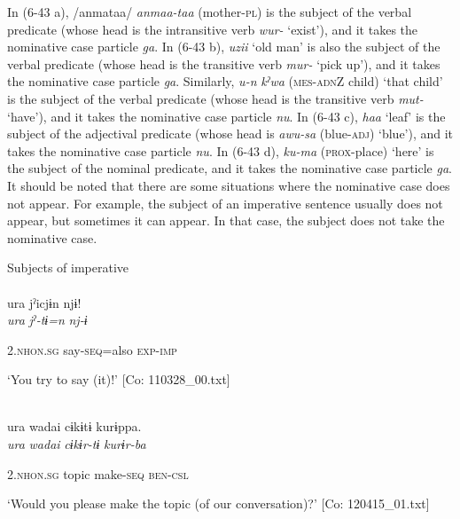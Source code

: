 In (6-43 a), /anmataa/ \textit{anmaa-taa} (mother-\textsc{pl}) is the subject of the verbal predicate (whose head is the intransitive verb \textit{wur-} ‘exist’), and it takes the nominative case particle \textit{ga}. In (6-43 b), \textit{uzii} ‘old man’ is also the subject of the verbal predicate (whose head is the transitive verb \textit{mur-} ‘pick up’), and it takes the nominative case particle \textit{ga}. Similarly, \textit{u-n} \textit{kˀwa} (\textsc{mes}-\textsc{adn}Z child) ‘that child’ is the subject of the verbal predicate (whose head is the transitive verb \textit{mut-} ‘have’), and it takes the nominative case particle \textit{nu}. In (6-43 c), \textit{haa} ‘leaf’ is the subject of the adjectival predicate (whose head is \textit{awu-sa} (blue-\textsc{adj}) ‘blue’), and it takes the nominative case particle \textit{nu}. In (6-43 d), \textit{ku-ma} (\textsc{prox}-place) ‘here’ is the subject of the nominal predicate, and it takes the nominative case particle \textit{ga}. It should be noted that there are some situations where the nominative case does not appear. For example, the subject of an imperative sentence usually does not appear, but sometimes it can appear. In that case, the subject does not take the nominative case.

\ea\label{ex:6-44}
 Subjects of imperative\\

 \ea{}\\
\gll  {\TM}  ura  jˀicjɨn  njɨ!\\

      \textit{ura}  \textit{jˀ-tɨ=n}  \textit{nj-ɨ}

      2.\textsc{nhon}.\textsc{sg}  say-\textsc{seq}=also  \textsc{exp}-\textsc{imp}

\glt ‘You try to say (it)!’ [Co: 110328\_00.txt]
\z

 \ex{}\\
{\TM}
\gll  ura  {\textbar}wadai{\textbar}  cɨkɨtɨ  kurɨppa.\\

      \textit{ura}  \textit{wadai}  \textit{cɨkɨr-tɨ}  \textit{kurɨr-ba}

      2.\textsc{nhon}.\textsc{sg}  topic  make-\textsc{seq}  \textsc{ben}-\textsc{csl}

\glt ‘Would you please make the topic (of our conversation)?’ [Co: 120415\_01.txt]
\z

